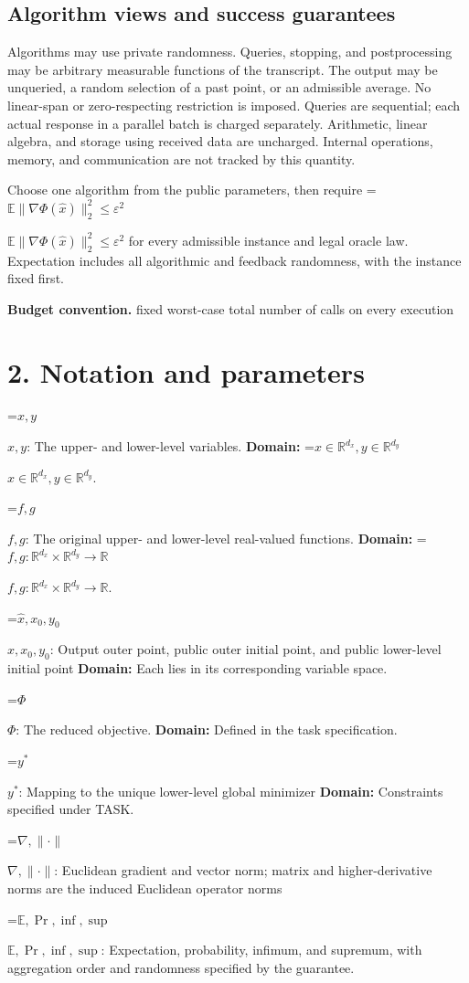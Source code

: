 \documentclass[10pt,a4paper]{article}
\newcommand{\AtlasMath}[1]{\par\begingroup\centering\setbox0=\hbox{$\displaystyle #1$}\ifdim\wd0>1.4\linewidth\typeout{ATLAS WIDE FORMULA: \the\wd0}\fi\ifdim\wd0>\linewidth\resizebox{\linewidth}{!}{\box0}\else\box0\fi\par\endgroup}
\newcommand{\AtlasInlineMath}[1]{\begingroup\setbox0=\hbox{$#1$}\ifdim\wd0>.4\linewidth\endgroup\AtlasMath{#1}\else\endgroup$#1$\fi}
\begin{document}
\subsection{Algorithm views and success guarantees}
Algorithms may use private randomness. Queries, stopping, and postprocessing may be arbitrary measurable functions of the transcript. The output may be unqueried, a random selection of a past point, or an admissible average. No linear-span or zero-respecting restriction is imposed. Queries are sequential; each actual response in a parallel batch is charged separately. Arithmetic, linear algebra, and storage using received data are uncharged. Internal operations, memory, and communication are not tracked by this quantity.

Choose one algorithm from the public parameters, then require \AtlasInlineMath{\mathbb{E}\|\nabla\Phi(\widehat{x})\|_2^2\le\varepsilon^2} for every admissible instance and legal oracle law. Expectation includes all algorithmic and feedback randomness, with the instance fixed first.

\textbf{Budget convention.} fixed worst-case total number of calls on every execution

\section{2. Notation and parameters}
\AtlasInlineMath{x,y}: The upper- and lower-level variables. \textbf{Domain:} \AtlasInlineMath{x\in\mathbb R^{d_x},y\in\mathbb R^{d_y}}.

\AtlasInlineMath{f,g}: The original upper- and lower-level real-valued functions. \textbf{Domain:} \AtlasInlineMath{f,g:\mathbb R^{d_x}\times\mathbb R^{d_y}\to\mathbb R}.

\AtlasInlineMath{\widehat x,x_0,y_0}: Output outer point, public outer initial point, and public lower-level initial point \textbf{Domain:} Each lies in its corresponding variable space.

\AtlasInlineMath{\Phi}: The reduced objective. \textbf{Domain:} Defined in the task specification.

\AtlasInlineMath{y^*}: Mapping to the unique lower-level global minimizer \textbf{Domain:} Constraints specified under TASK.

\AtlasInlineMath{\nabla,\|\cdot\|}: Euclidean gradient and vector norm; matrix and higher-derivative norms are the induced Euclidean operator norms

\AtlasInlineMath{\mathbb E,\Pr,\inf,\sup}: Expectation, probability, infimum, and supremum, with aggregation order and randomness specified by the guarantee.
\end{document}
